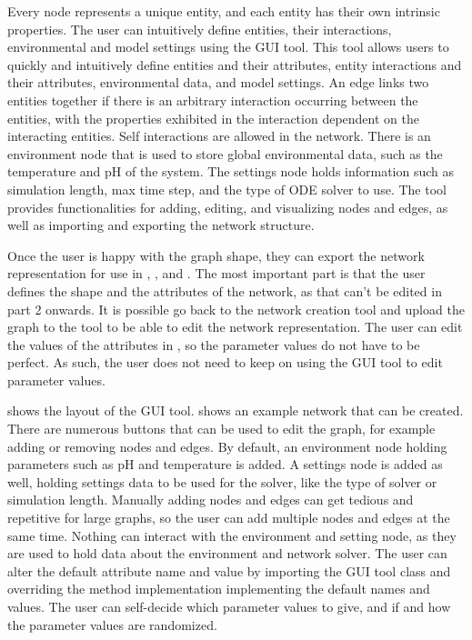 Every node represents a unique entity, and each entity has their own intrinsic properties. 
The user can intuitively define entities, their interactions, environmental and model settings using the GUI tool. 
This tool allows users to quickly and intuitively define entities and their attributes, entity interactions and their attributes, environmental data, and model settings.
An edge links two entities together if there is an arbitrary interaction occurring between the entities, with the properties exhibited in the interaction dependent on the interacting entities. 
Self interactions are allowed in the network. 
There is an environment node that is used to store global environmental data, such as the temperature and pH of the system.
The settings node holds information such as simulation length, max time step, and the type of ODE solver to use.
The tool provides functionalities for adding, editing, and visualizing nodes and edges, as well as importing and exporting the network structure.  

Once the user is happy with the graph shape, they can export the network representation for use in , , and . 
The most important part is that the user defines the shape and the attributes of the network, as that can't be edited in part 2 onwards. 
It is possible go back to the network creation tool and upload the graph to the tool to be able to edit the network representation. \newline
The user can edit the values of the attributes in , so the parameter values do not have to be perfect. 
As such, the user does not need to keep on using the GUI tool to edit parameter values. 

 shows the layout of the GUI tool.  shows an example network that can be created.
There are numerous buttons that can be used to edit the graph, for example adding or removing nodes and edges. 
By default, an environment node holding parameters such as pH and temperature is added.
A settings node is added as well, holding settings data to be used for the solver, like the type of solver or simulation length.
Manually adding nodes and edges can get tedious and repetitive for large graphs, so the user can add multiple nodes and edges at the same time.
Nothing can interact with the environment and setting node, as they are used to hold data about the environment and network solver.
The user can alter the default attribute name and value by importing the GUI tool class and overriding the method implementation implementing the default names and values. 
The user can self-decide which parameter values to give, and if and how the parameter values are randomized. 

